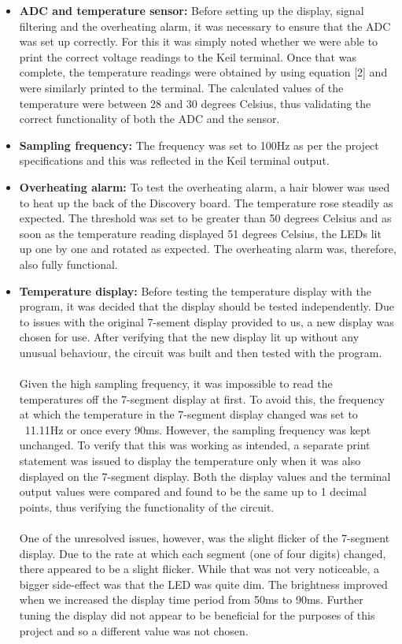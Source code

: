 \documentclass{article}
\begin{document}
\begin{itemize}
\item \textbf{ADC and temperature sensor:} Before setting up the display, signal filtering and the overheating alarm, it was necessary to ensure that the ADC was set up correctly. For this it was simply noted whether we were able to print the correct voltage readings to the Keil terminal. Once that was complete, the temperature readings were obtained by using equation [2] and were similarly printed to the terminal. The calculated values of the temperature were between 28 and 30 degrees Celsius, thus validating the correct functionality of both the ADC and the sensor.
\item \textbf{Sampling frequency:} The frequency was set to 100Hz as per the project specifications and this was reflected in the Keil terminal output.
\item \textbf{Overheating alarm:} To test the overheating alarm, a hair blower was used to heat up the back of the Discovery board. The temperature rose steadily as expected. The threshold was set to be greater than 50 degrees Celsius and as soon as the temperature reading displayed 51 degrees Celsius, the LEDs lit up one by one and rotated as expected. The overheating alarm was, therefore, also fully functional.
\item \textbf{Temperature display:} Before testing the temperature display with the program, it was decided that the display should be tested independently. Due to issues with the original 7-sement display provided to us, a new display was chosen for use. After verifying that the new display lit up without any unusual behaviour, the circuit was built and then tested with the program. \\
\\Given the high sampling frequency, it was impossible to read the temperatures off the 7-segment display at first. To avoid this, the frequency at which the temperature in the 7-segment display changed was set to ~11.11Hz or once every 90ms. However, the sampling frequency was kept unchanged. To verify that this was working as intended, a separate print statement was issued to display the temperature only when it was also displayed on the 7-segment display. Both the display values and the terminal output values were compared and found to be the same up to 1 decimal points, thus verifying the functionality of the circuit.\\
\\One of the unresolved issues, however, was the slight flicker of the 7-segment display. Due to the rate at which each segment (one of four digits) changed, there appeared to be a slight flicker. While that was not very noticeable, a bigger side-effect was that the LED was quite dim. The brightness improved when we increased the display time period from 50ms to 90ms. Further tuning the display did not appear to be beneficial for the purposes of this project and so a different value was not chosen.

\end{itemize}
\end{document}
